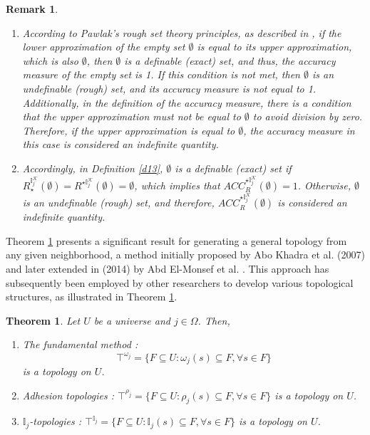 \documentclass{article}
\theoremstyle{theorem}
\newtheorem{theorem}{Theorem}[section]
\newtheorem{remark}{Remark}[section]
\theoremstyle{definition}
\theoremstyle{remark}
\begin{document}
\begin{remark} \label{emptycondition}
\begin{enumerate}
\item According to Pawlak's rough set theory principles, as described in \cite{Pawlak 1982}, if the lower approximation of the empty set $\emptyset$ is equal to its upper approximation, which is also $\emptyset$, then $\emptyset$ is a definable (exact) set, and thus, the accuracy measure of the empty set is 1. If this condition is not met, then $\emptyset$ is an undefinable (rough) set, and its accuracy measure is not equal to 1. Additionally, in the definition of the accuracy measure, there is a condition that the upper approximation must not be equal to $\emptyset$ to avoid division by zero. Therefore, if the upper approximation is equal to $\emptyset$, the accuracy measure in this case is considered an indefinite quantity.
\item Accordingly, in Definition \ref{d13}, $\emptyset$ is a definable (exact) set if $R_{\star}^{\mathbb{I}_{j}^{\mathcal{K}}}(\emptyset) = R^{\star\mathbb{I}_{j}^{\mathcal{K}}}(\emptyset) = \emptyset$, which implies that $ACC_{R}^{\star\mathbb{I}_{j}^{\mathcal{K}}}(\emptyset) = 1$. Otherwise, $\emptyset$ is an undefinable (rough) set, and therefore, $ACC_{R}^{\star\mathbb{I}_{j}^{\mathcal{K}}}(\emptyset)$ is considered an indefinite quantity.
\end{enumerate}
\end{remark}

Theorem \ref{t1} presents a significant result for generating a general topology from any given neighborhood, a method initially proposed by Abo Khadra et al. (2007) \cite{khadra2007} and later extended  in (2014) by Abd El-Monsef et al. \cite{Abd El-Monsef 2014}. This approach has subsequently been employed by other researchers to develop various topological structures, as illustrated in Theorem \ref{t1}.
\color{black}
\begin{theorem}\label{t1} Let $U$ be a universe and $j \in \Omega$. Then,

\begin{enumerate}
\item The fundamental method \cite{khadra2007,Abd El-Monsef 2014}: $$\top^{\omega_j} = \{F \subseteq U :  \omega_{j}(s) \subseteq F, \forall s \in F\}$$ is a topology on $U$.
\item Adhesion topologies \cite{Atef 2020, El-Bably 2021, Nawar 2021}: $\top^{\rho_j}= \{F \subseteq U :  \rho_{j}(s) \subseteq F, \forall s \in F\}$ is a topology on $U$.
\item $\mathbb{I}_{j}$-topologies \cite{Al-shami 2021}: $\top^{\mathbb{I}_j} = \{F \subseteq U :  \mathbb{I}_{j}(s) \subseteq F, \forall s \in F\}$ is a topology on $U$.
\end{enumerate}
\end{theorem}
\end{document}
